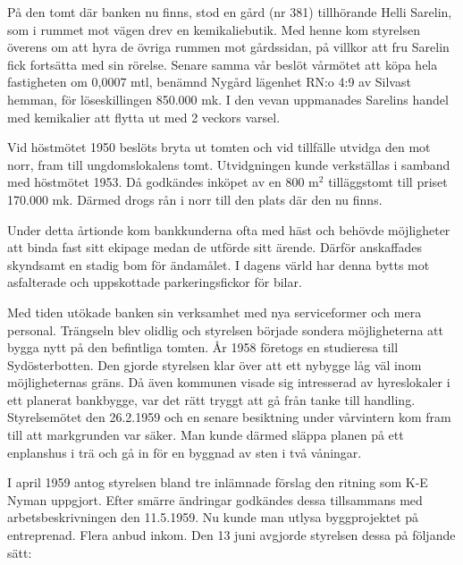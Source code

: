 På den tomt där banken nu finns, stod en gård (nr 381) tillhörande Helli Sarelin, som i rummet mot vägen drev en kemikaliebutik. Med henne kom styrelsen överens om att hyra de övriga rummen mot gårdssidan, på villkor att fru Sarelin fick fortsätta med sin rörelse. Senare samma vår beslöt vårmötet att köpa hela fastigheten om 0,0007 mtl, benämnd Nygård lägenhet RN:o 4:9 av Silvast hemman, för löseskillingen 850.000 mk. I den vevan uppmanades Sarelins handel med kemikalier att flytta ut med 2 veckors varsel.


Vid höstmötet 1950 beslöts bryta ut tomten och vid tillfälle utvidga den mot norr, fram till ungdomslokalens tomt. Utvidgningen kunde verkställas i samband med höstmötet 1953. Då godkändes inköpet av en 800 m$^2$ tilläggstomt till priset 170.000 mk. Därmed drogs rån i norr till den plats där den nu finns.

Under detta årtionde kom bankkunderna ofta med häst och behövde möjligheter att binda fast sitt ekipage medan de utförde sitt ärende. Därför anskaffades skyndsamt en stadig bom för ändamålet. I dagens värld har denna bytts mot asfalterade och uppskottade parkeringsfickor för bilar.

Med tiden utökade banken sin verksamhet med nya serviceformer och mera personal. Trängseln blev olidlig och styrelsen började sondera möjligheterna att bygga nytt på den befintliga tomten. År 1958 företogs en studieresa till Sydösterbotten. Den gjorde styrelsen klar över att ett nybygge låg väl inom möjligheternas gräns. Då även kommunen visade sig intresserad av hyreslokaler i ett planerat bankbygge, var det rätt tryggt att gå från tanke till handling. Styrelsemötet den 26.2.1959 och en senare besiktning under vårvintern kom fram till att markgrunden var säker. Man kunde därmed släppa planen på ett enplanshus i trä och gå in för en byggnad av sten i två våningar.

I april 1959 antog styrelsen bland tre inlämnade förslag den ritning som K-E Nyman uppgjort. Efter smärre ändringar godkändes dessa tillsammans med arbetsbeskrivningen den 11.5.1959. Nu kunde man utlysa byggprojektet på entreprenad. Flera anbud inkom. Den 13 juni avgjorde styrelsen dessa på följande sätt:

